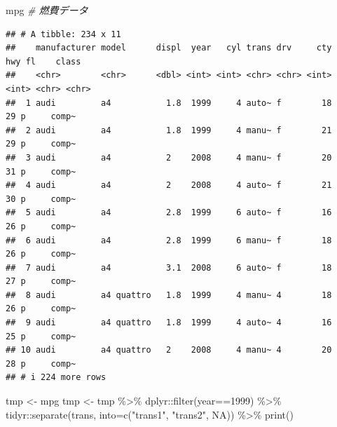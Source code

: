 \documentclass[
]{article}
\newenvironment{Shaded}{\begin{snugshade}}{\end{snugshade}}
\newcommand{\AttributeTok}[1]{\textcolor[rgb]{0.77,0.63,0.00}{#1}}
\newcommand{\CommentTok}[1]{\textcolor[rgb]{0.56,0.35,0.01}{\textit{#1}}}
\newcommand{\ConstantTok}[1]{\textcolor[rgb]{0.00,0.00,0.00}{#1}}
\newcommand{\DecValTok}[1]{\textcolor[rgb]{0.00,0.00,0.81}{#1}}
\newcommand{\FunctionTok}[1]{\textcolor[rgb]{0.00,0.00,0.00}{#1}}
\newcommand{\NormalTok}[1]{#1}
\newcommand{\OtherTok}[1]{\textcolor[rgb]{0.56,0.35,0.01}{#1}}
\newcommand{\SpecialCharTok}[1]{\textcolor[rgb]{0.00,0.00,0.00}{#1}}
\newcommand{\StringTok}[1]{\textcolor[rgb]{0.31,0.60,0.02}{#1}}
\begin{document}
\begin{Shaded}
\begin{Highlighting}[]
\NormalTok{mpg }\CommentTok{\# 燃費データ}
\end{Highlighting}
\end{Shaded}

\begin{verbatim}
## # A tibble: 234 x 11
##    manufacturer model      displ  year   cyl trans drv     cty   hwy fl    class
##    <chr>        <chr>      <dbl> <int> <int> <chr> <chr> <int> <int> <chr> <chr>
##  1 audi         a4           1.8  1999     4 auto~ f        18    29 p     comp~
##  2 audi         a4           1.8  1999     4 manu~ f        21    29 p     comp~
##  3 audi         a4           2    2008     4 manu~ f        20    31 p     comp~
##  4 audi         a4           2    2008     4 auto~ f        21    30 p     comp~
##  5 audi         a4           2.8  1999     6 auto~ f        16    26 p     comp~
##  6 audi         a4           2.8  1999     6 manu~ f        18    26 p     comp~
##  7 audi         a4           3.1  2008     6 auto~ f        18    27 p     comp~
##  8 audi         a4 quattro   1.8  1999     4 manu~ 4        18    26 p     comp~
##  9 audi         a4 quattro   1.8  1999     4 auto~ 4        16    25 p     comp~
## 10 audi         a4 quattro   2    2008     4 manu~ 4        20    28 p     comp~
## # i 224 more rows
\end{verbatim}

\begin{Shaded}
\begin{Highlighting}[]
\NormalTok{tmp }\OtherTok{\textless{}{-}}\NormalTok{ mpg}
\NormalTok{tmp }\OtherTok{\textless{}{-}}
\NormalTok{  tmp }\SpecialCharTok{\%\textgreater{}\%}
\NormalTok{  dplyr}\SpecialCharTok{::}\FunctionTok{filter}\NormalTok{(year}\SpecialCharTok{==}\DecValTok{1999}\NormalTok{) }\SpecialCharTok{\%\textgreater{}\%}
\NormalTok{  tidyr}\SpecialCharTok{::}\FunctionTok{separate}\NormalTok{(trans, }\AttributeTok{into=}\FunctionTok{c}\NormalTok{(}\StringTok{"trans1"}\NormalTok{, }\StringTok{"trans2"}\NormalTok{, }\ConstantTok{NA}\NormalTok{)) }\SpecialCharTok{\%\textgreater{}\%}
  \FunctionTok{print}\NormalTok{()}
\end{Highlighting}
\end{Shaded}
\end{document}
